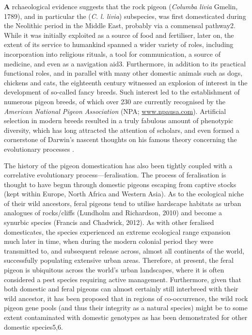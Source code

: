 \documentclass[twoside, british, a4paper]{article}
\begin{document}
\begin{multicols}{2}
\lettrine[findent=2pt]{\textbf{A}}{ }rchaeological evidence suggests that the rock pigeon (\textit{Columba livia} Gmelin, 1789), and in particular the (\textit{C. l. livia}) subspecies, was first domesticated during the Neolithic period in the Middle East, probably via a commensal pathway2. While it was initially exploited as a source of food and fertiliser, later on, the extent of its service to humankind spanned a wider variety of roles, including incorporation into religious rituals, a tool for communication, a source of medicine, and even as a navigation aid3. Furthermore, in addition to its practical functional roles, and in parallel with many other domestic animals such as dogs, chickens and cats, the eighteenth century witnessed an explosion of interest in the development of so-called fancy breeds. Such interest led to the establishment of numerous pigeon breeds, of which over 230 are currently recognised by the \textit{American National Pigeon Association} (NPA; \url{www.npausa.com}). Artificial selection in modern breeds resulted in a truly fabulous amount of phenotypic diversity, which has long attracted the attention of scholars, and even formed a cornerstone of Darwin’s nascent thoughts on his famous theory concerning the evolutionary processes \cite{pacheco_darwins_2020}. \

The history of the pigeon domestication has also been tightly coupled with a correlative evolutionary process—feralisation. The process of feralisation is thought to have begun through domestic pigeons escaping from captive stocks (kept within Europe, North Africa and Western Asia). As to the ecological niche of their wild ancestors, feral pigeons tend to utilise hardscape habitats as urban analogues of rocks/cliffs (Lundholm and Richardson, 2010) and become a synurbic species (Francis and Chadwick, 2012). As with other feralised domesticates, the species experienced an extreme ecological range expansion much later in time, when during the modern colonial period they were transmitted to, and subsequent release across, almost all continents of the world, successfully populating extensive urban areas. Therefore, at present, the feral pigeon is ubiquitous across the world’s urban landscapes, where it is often considered a pest species requiring active management. Furthermore, given that both domestic and feral pigeons can almost certainly still interbreed with their wild ancestor, it has been proposed that in regions of co-occurrence, the wild rock pigeon gene pools (and thus their integrity as a natural species) might be to some extent contaminated with domestic genotypes as has been demonstrated for other domestic species5,6. \


\end{multicols}
\end{document}
